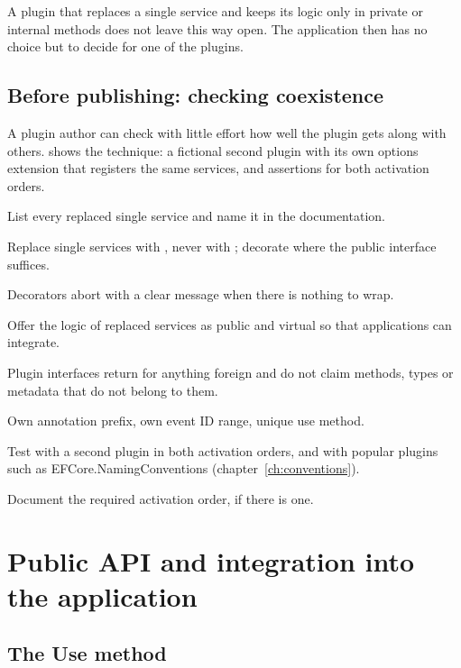 A plugin that replaces a single service and keeps its logic only in private or internal
methods does not leave this way open. The application then has no choice but to decide for
one of the plugins.

\section{Before publishing: checking coexistence}

A plugin author can check with little effort how well the plugin gets along with others.
 shows the technique: a fictional
second plugin with its own options extension that registers the same services, and
assertions for both activation orders.

\begin{checklist}
  \item List every replaced single service and name it in the documentation.
  \item Replace single services with , never with ;
    decorate where the public interface suffices.
  \item Decorators abort with a clear message when there is nothing to wrap.
  \item Offer the logic of replaced services as public and virtual so that applications can
    integrate.
  \item Plugin interfaces return  for anything foreign and do not claim methods,
    types or metadata that do not belong to them.
  \item Own annotation prefix, own event ID range, unique use method.
  \item Test with a second plugin in both activation orders, and with popular plugins such as
    EFCore.NamingConventions (chapter~\ref{ch:conventions}).
  \item Document the required activation order, if there is one.
\end{checklist}

\chapter{Public API and integration into the application}\label{ch:public-api-and-integration-into}

\section{The Use method}

